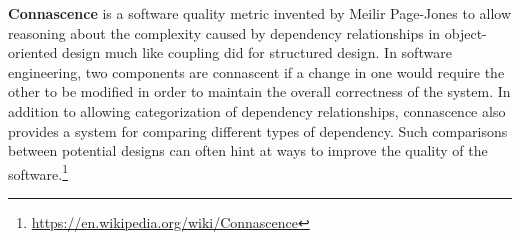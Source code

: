 \documentclass[calcdimensions,landscape,letterpaper]{powersem}
\newcommand{\thecurrentheading}{}
\newcommand{\heading}[1]{\renewcommand{\thecurrentheading}{#1}}
\begin{document}
\begin{slide}
  \heading{Arjan Egges: Uncle Bob's SOLID Principles Made Easy}
  \begin{center}
    \href{https://www.youtube.com/watch?v=pTB30aXS77U}{}
  \end{center}
\end{slide}

\begin{slide}
  \heading{Jim Weirich: The Building Blocks of Modularity}
  \begin{center}
    \href{https://www.youtube.com/watch?v=q85rdBMe9GY}{}
  \end{center}
\end{slide}

\begin{slide}
  \heading{Connascence}
  \textbf{Connascence} \textipa{[k@'neIs@ns]} is a software quality metric invented by Meilir Page-Jones to allow reasoning about the
  complexity caused by dependency relationships in object-oriented design much like coupling did for structured design. In software
  engineering, two components are connascent if a change in one would require the other to be modified in order to maintain the
  overall correctness of the system. In addition to allowing categorization of dependency relationships, connascence also provides
  a system for comparing different types of dependency. Such comparisons between potential designs can often hint at ways to
  improve the quality of the software.\footnote{\url{https://en.wikipedia.org/wiki/Connascence}}
\end{slide}
\end{document}

